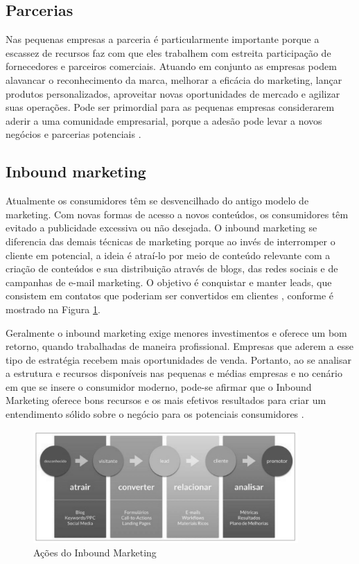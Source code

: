 \subsection{Parcerias}
\label{subsec:framing}

Nas pequenas empresas a parceria é particularmente importante porque a escassez de recursos faz com que eles trabalhem com estreita participação de fornecedores e parceiros comerciais. Atuando em conjunto as empresas podem alavancar o reconhecimento da marca, melhorar a eficácia do marketing, lançar produtos personalizados, aproveitar novas oportunidades de mercado e agilizar suas operações. Pode ser primordial para as pequenas empresas considerarem aderir a uma comunidade empresarial, porque a adesão pode levar a novos negócios e parcerias potenciais \cite{terc2009}.

\subsection{Inbound marketing}
\label{subsec:framing}

Atualmente os consumidores têm se desvencilhado do antigo modelo de marketing. Com novas formas de acesso a novos conteúdos, os consumidores têm evitado a publicidade excessiva ou não desejada. O inbound marketing se diferencia das demais técnicas de marketing porque ao invés de interromper o cliente em potencial, a ideia é atraí-lo por meio de conteúdo relevante com a criação de conteúdos e sua distribuição através de blogs, das redes sociais e de campanhas de e-mail marketing. O objetivo é conquistar e manter leads, que consistem em contatos que poderiam ser convertidos em clientes \cite{inbci}, conforme é mostrado na Figura \ref{fig:inboundmarketing}.  

Geralmente o inbound marketing exige menores investimentos e oferece um bom retorno, quando trabalhadas de maneira profissional. Empresas que aderem a esse tipo de estratégia recebem mais oportunidades de venda. Portanto, ao se analisar a estrutura e recursos disponíveis nas pequenas e médias empresas e no cenário em que se insere o consumidor moderno, pode-se afirmar que o Inbound Marketing oferece bons recursos e os mais efetivos resultados para criar um entendimento sólido sobre o negócio para os potenciais consumidores \cite{inbpme}.

\begin{figure}[hbt!]
 \centering
  \includegraphics[width=0.90\textwidth]{./fig/inboundmarketing2}
 \caption{Ações do Inbound Marketing \cite{inbci}}
 \label{fig:inboundmarketing}
\end{figure}
